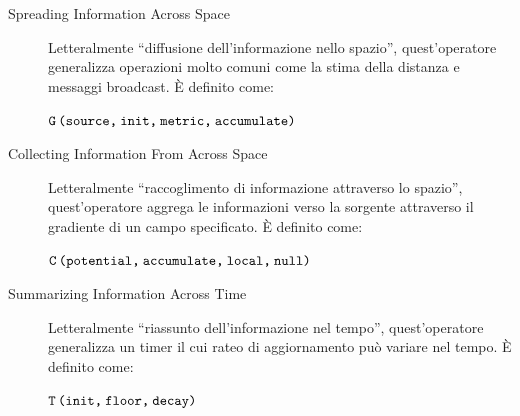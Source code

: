
\begin{description}
  \item[Spreading Information Across Space]
    Letteralmente \enquote{diffusione dell'informazione nello spazio},
    quest'operatore generalizza operazioni molto comuni come la stima della distanza e messaggi broadcast.
    È definito come:

    \(\texttt{G\,(source,\:init,\:metric,\:accumulate)}\)

  \item[Collecting Information From Across Space]
    Letteralmente \enquote{raccoglimento di informazione attraverso lo spazio},
    quest'operatore aggrega le informazioni verso la sorgente attraverso il gradiente di un campo specificato.
    È definito come:

    \(\texttt{C\,(potential,\:accumulate,\:local,\:null)}\)

  \item[Summarizing Information Across Time]
    Letteralmente \enquote{riassunto dell'informazione nel tempo},
    quest'operatore generalizza un timer il cui rateo di aggiornamento può variare nel tempo.
    È definito come:

    \(\texttt{T\,(init,\:floor,\:decay)}\)
\end{description}

